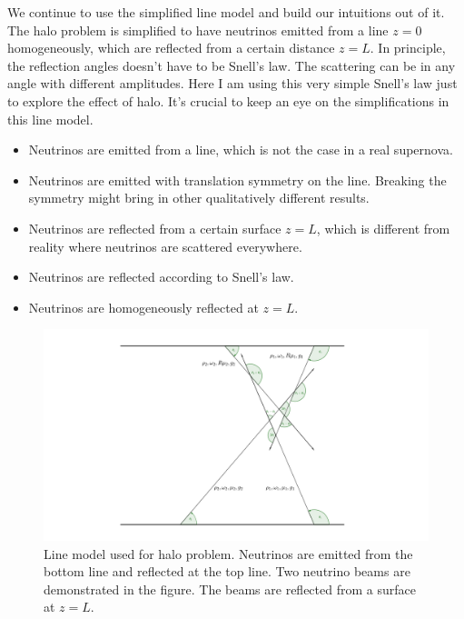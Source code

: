 We continue to use the simplified line model and build our intuitions out of it. The halo problem is simplified to have neutrinos emitted from a line $z=0$ homogeneously, which are reflected from a certain distance $z=L$. In principle, the reflection angles doesn’t have to be Snell’s law. The scattering can be in any angle with different amplitudes. Here I am using this very simple Snell’s law just to explore the effect of halo. It's crucial to keep an eye on the simplifications in this line model.
\begin{itemize}
    \item Neutrinos are emitted from a line, which is not the case in a real supernova.
    \item Neutrinos are emitted with translation symmetry on the line. Breaking the symmetry might bring in other qualitatively different results.
    \item Neutrinos are reflected from a certain surface $z=L$, which is different from reality where neutrinos are scattered everywhere.
    \item Neutrinos are reflected according to Snell's law.
    \item Neutrinos are homogeneously reflected at $z=L$.
\end{itemize}



\begin{figure}
    \centering
    \includegraphics[width=\textwidth]{chapters/assets/halo/line-model.pdf}
    \caption{Line model used for halo problem. Neutrinos are emitted from the bottom line and reflected at the top line. Two neutrino beams are demonstrated in the figure. The beams are reflected from a surface at $z=L$.}
    \label{chap:halo-sec:line-fig:line-model}
\end{figure}


